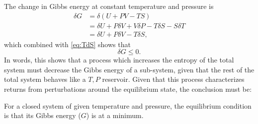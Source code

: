 \documentclass[internal,english]{sintefmemo2012}
\begin{document}
The change in Gibbs energy at constant temperature and pressure is 
\begin{align}
  \delta G &= \delta \left( U + PV - TS \right) \nonumber\\ 
  &= \delta U + P \delta V + V \delta P - T \delta S - S \delta T \nonumber\\
  &= \delta U + P \delta V - T \delta S,
  \label{}
\end{align}
which combined with \eqref{eq:TdS} shows that
\begin{equation}
  \delta G \leq 0.
  \label{}
\end{equation}
In words, this shows that a process which increases the entropy of the total system must decrease the Gibbs energy of a sub-system, given that the rest of the 
total system behaves like a $T,P$ reservoir. Given that this process characterizes returns from perturbations around the equilibrium state, the 
conclusion must be:
\begin{framed}
  \noindent
  For a closed system of given temperature and pressure, the equilibrium condition is that its Gibbs energy ($G$) is at a minimum. 
\end{framed}
\end{document}
